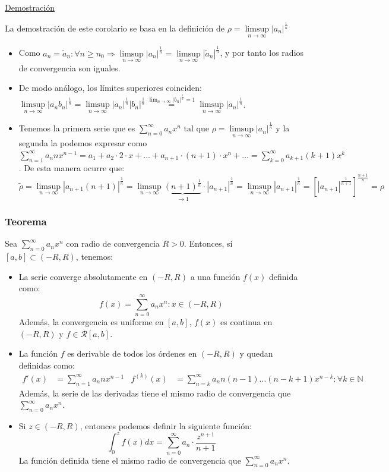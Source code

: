 \documentclass[10pt,a4paper,openright]{book}
\begin{document}
\underline{Demostración}

La demostración de este corolario se basa en la definición de $\rho = \underset{n \to \infty}\limsup |a_n|^{\frac{1}{n}}$

\begin{itemize}
\item Como $a_n = \tilde{a}_n : \forall n \geq n_0 \Rightarrow \underset{n \to \infty}\limsup |a_n|^{\frac{1}{n}} = \underset{n \to \infty}\limsup |\tilde{a}_n|^{\frac{1}{n}}$, y por tanto los radios de convergencia son iguales.

\item De modo análogo, los límites superiores coinciden: $\underset{n \to \infty}\limsup |a_n b_n|^{\frac{1}{n}} = \underset{n \to \infty}\limsup |a_n|^{\frac{1}{n}} |b_n|^{\frac{1}{n}} \overset{\lim_{n \to \infty} |b_n|^\frac{1}{n} = 1}{=} \underset{n \to \infty}\limsup |a_n|^{\frac{1}{n}}$.

\item Tenemos la primera serie que es $\sum_{n=0}^{\infty} a_n x^n \mbox{ tal que } \rho = \underset{n \to \infty}\limsup |a_n|^{\frac{1}{n}}$ y la segunda la podemos expresar como $\sum_{n=1}^{\infty} a_n n x^{n-1} = a_1 + a_2 \cdot 2 \cdot x + \ldots + a_{n+1} \cdot (n+1) \cdot x^n + \ldots = \sum_{k=0}^{\infty} a_{k+1}(k+1) x^k$. De esta manera ocurre que:
$$\tilde{\rho} = \underset{n \to \infty}\limsup |a_{n+1} (n+1)|^\frac{1}{n} = \underset{n \to \infty}\limsup \underbrace{(n+1)^\frac{1}{n}}_{\to 1} \cdot |a_{n+1}|^\frac{1}{n} = \underset{n \to \infty}\limsup |a_{n+1}|^\frac{1}{n} = [|a_{n+1}|^\frac{1}{n+1}]^\frac{n+1}{n} = \rho$$
\end{itemize}

\subsubsection*{Teorema}
Sea $\sum_{n=0}^{\infty} a_n x^n$ con radio de convergencia $R>0$. Entonces, si $[a,b] \subset (-R, R)$, tenemos:
\begin{itemize}
\item La serie converge absolutamente en $(-R, R)$ a una función $f(x)$ definida como:
$$f(x) = \sum_{n=0}^{\infty} a_n x^n : x \in (-R, R) $$
Además, la convergencia es uniforme en $[a,b]$, $f(x)$ es continua en $(-R, R)$ y $f \in \mathcal{R}[a,b]$.

\item La función $f$ es derivable de todos los órdenes en $(-R, R)$ y quedan definidas como:
\begin{align*}
f'(x) & = \sum_{n=1}^{\infty} a_n n x^{n-1} & f^{(k)}(x) & = \sum_{n = k}^{\infty} a_n n (n-1) \ldots (n- k + 1) x^{n-k} : \forall k \in \mathbb{N}
\end{align*}
Además, la serie de las derivadas tiene el mismo radio de convergencia que $\sum_{n=0}^{\infty} a_n x^n$.

\item Si $z \in (-R,R)$, entonces podemos definir la siguiente función:
$$\int_{0}^{z} f(x) dx = \sum_{n=0}^{\infty} a_n \cdot \frac{z^{n+1}}{n+1}$$
La función definida tiene el mismo radio de convergencia que $\sum_{n=0}^{\infty} a_n x^n$.
\end{itemize}
\end{document}
